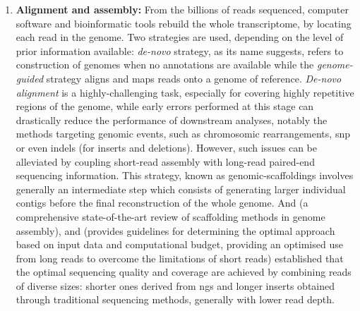 \begin{enumerate}[label=(\roman*)]
    \item \textbf{Alignment and assembly:}  From the billions of reads sequenced, computer software and bioinformatic tools rebuild the whole transcriptome, by locating each read in the genome. Two strategies are used, depending on the level of prior information available: \emph{de-novo} strategy, as its name suggests, refers to construction of genomes when no annotations are available while the \emph{genome-guided} strategy aligns and maps reads onto a genome of reference.     
    \emph{De-novo alignment} is a highly-challenging task, especially for covering highly repetitive regions of the genome, while early errors performed at this stage can drastically reduce the performance of downstream analyses, notably the methods targeting genomic events, such as chromosomic rearrangements, \acrfull{snp} or even indels (for inserts and deletions). However, such issues can be alleviated by coupling short-read assembly with long-read paired-end sequencing information. This strategy, known as \glspl{genomic-scaffolding} involves generally an intermediate step which consists of generating larger individual \glspl{contig} before the final reconstruction of the whole genome. And \autocite{luo_etal21} (a comprehensive state-of-the-art review of scaffolding methods in genome assembly), \autocite{rice_green19} and \autocite{sohn_nam18} (provides guidelines for determining the optimal approach based on input data and computational budget, providing an optimised use from long reads to overcome the limitations of short reads) established that the optimal sequencing quality and coverage are achieved by combining reads of diverse sizes: shorter ones derived from \acrshort{ngs} and longer inserts obtained through traditional sequencing methods, generally with lower read depth.
    

\end{enumerate}

